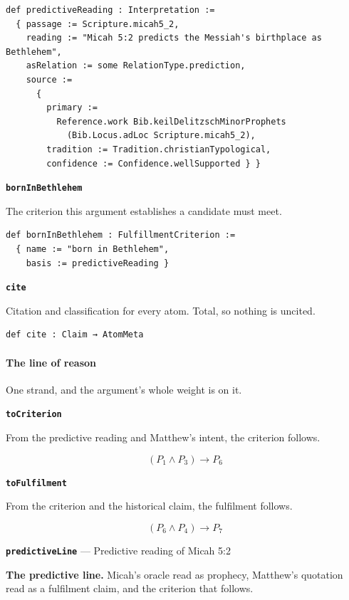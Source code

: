 \documentclass[11pt]{article}
\begin{document}
{\small\begin{verbatim}
def predictiveReading : Interpretation :=
  { passage := Scripture.micah5_2,
    reading := "Micah 5:2 predicts the Messiah's birthplace as Bethlehem",
    asRelation := some RelationType.prediction,
    source :=
      {
        primary :=
          Reference.work Bib.keilDelitzschMinorProphets
            (Bib.Locus.adLoc Scripture.micah5_2),
        tradition := Tradition.christianTypological,
        confidence := Confidence.wellSupported } }
\end{verbatim}}
\par\medskip\noindent\textbf{\texttt{born\allowbreak{}In\allowbreak{}Bethlehem}}\par\nobreak\noindent
The criterion this argument establishes a candidate must meet.

{\small\begin{verbatim}
def bornInBethlehem : FulfillmentCriterion :=
  { name := "born in Bethlehem",
    basis := predictiveReading }
\end{verbatim}}
\par\medskip\noindent\textbf{\texttt{cite}}\par\nobreak\noindent
Citation and classification for every atom. Total, so nothing is uncited.

{\small\begin{verbatim}
def cite : Claim → AtomMeta
\end{verbatim}}
\paragraph*{The line of reason}
\leavevmode\par
One strand, and the argument's whole weight is on it.

\par\medskip\noindent\textbf{\texttt{to\allowbreak{}Criterion}}\par\nobreak\noindent
From the predictive reading and Matthew's intent, the criterion follows.

\[(P_{1} \land P_{3}) \rightarrow P_{6}\]
\par\medskip\noindent\textbf{\texttt{to\allowbreak{}Fulfilment}}\par\nobreak\noindent
From the criterion and the historical claim, the fulfilment follows.

\[(P_{6} \land P_{4}) \rightarrow P_{7}\]
\par\medskip\noindent\textbf{\texttt{predictive\allowbreak{}Line}} --- Predictive reading of Micah 5:2\par\nobreak\noindent
\textbf{The predictive line.} Micah's oracle read as prophecy, Matthew's quotation read as a fulfilment claim, and the criterion that follows.
\end{document}
